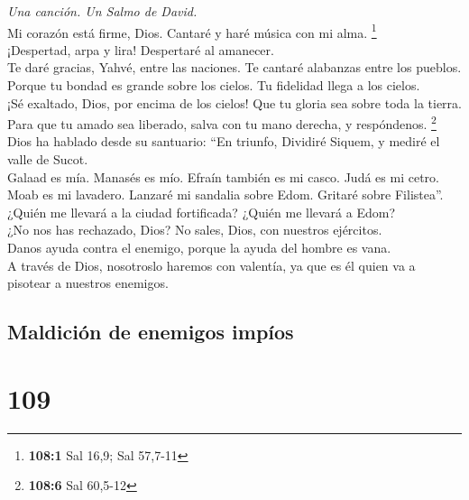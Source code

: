 \emph{Una canción. Un Salmo de David.}\\
 Mi corazón está firme, Dios. Cantaré y haré música con mi
alma. \footnote{\textbf{108:1} Sal 16,9; Sal 57,7-11}\\
 ¡Despertad, arpa y lira! Despertaré al amanecer.\\
 Te daré gracias, Yahvé, entre las naciones. Te cantaré
alabanzas entre los pueblos.\\
 Porque tu bondad es grande sobre los cielos. Tu fidelidad
llega a los cielos.\\
 ¡Sé exaltado, Dios, por encima de los cielos! Que tu
gloria sea sobre toda la tierra.\\
 Para que tu amado sea liberado, salva con tu mano
derecha, y respóndenos. \footnote{\textbf{108:6} Sal 60,5-12}\\
 Dios ha hablado desde su santuario: ``En triunfo,
Dividiré Siquem, y mediré el valle de Sucot.\\
 Galaad es mía. Manasés es mío. Efraín también es mi
casco. Judá es mi cetro.\\
 Moab es mi lavadero. Lanzaré mi sandalia sobre Edom.
Gritaré sobre Filistea''.\\
 ¿Quién me llevará a la ciudad fortificada? ¿Quién me
llevará a Edom?\\
 ¿No nos has rechazado, Dios? No sales, Dios, con
nuestros ejércitos.\\
 Danos ayuda contra el enemigo, porque la ayuda del
hombre es vana.\\
 A través de Dios, nosotroslo haremos con valentía, ya
que es él quien va a pisotear a nuestros enemigos.

\hypertarget{maldiciuxf3n-de-enemigos-impuxedos}{%
\subsection{Maldición de enemigos
impíos}\label{maldiciuxf3n-de-enemigos-impuxedos}}

\hypertarget{section-106}{%
\section{109}\label{section-106}}

